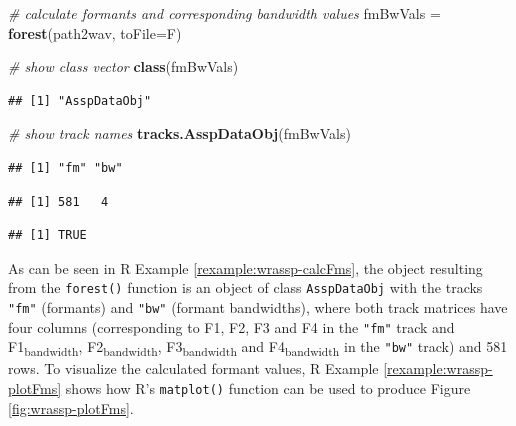 \documentclass[]{book}
\newenvironment{Shaded}{\begin{snugshade}}{\end{snugshade}}
\newcommand{\CommentTok}[1]{\textcolor[rgb]{0.56,0.35,0.01}{\textit{#1}}}
\newcommand{\DataTypeTok}[1]{\textcolor[rgb]{0.13,0.29,0.53}{#1}}
\newcommand{\KeywordTok}[1]{\textcolor[rgb]{0.13,0.29,0.53}{\textbf{#1}}}
\newcommand{\NormalTok}[1]{#1}
\newcommand{\OperatorTok}[1]{\textcolor[rgb]{0.81,0.36,0.00}{\textbf{#1}}}
\newcommand{\StringTok}[1]{\textcolor[rgb]{0.31,0.60,0.02}{#1}}
\theoremstyle{definition}
\theoremstyle{definition}
\theoremstyle{definition}
\theoremstyle{remark}
\begin{document}
\begin{Shaded}
\begin{Highlighting}[]
\CommentTok{# calculate formants and corresponding bandwidth values}
\NormalTok{fmBwVals =}\StringTok{ }\KeywordTok{forest}\NormalTok{(path2wav, }\DataTypeTok{toFile=}\NormalTok{F)}

\CommentTok{# show class vector}
\KeywordTok{class}\NormalTok{(fmBwVals)}
\end{Highlighting}
\end{Shaded}

\begin{verbatim}
## [1] "AsspDataObj"
\end{verbatim}

\begin{Shaded}
\begin{Highlighting}[]
\CommentTok{# show track names}
\KeywordTok{tracks.AsspDataObj}\NormalTok{(fmBwVals)}
\end{Highlighting}
\end{Shaded}

\begin{verbatim}
## [1] "fm" "bw"
\end{verbatim}

\begin{Shaded}
\end{Shaded}

\begin{verbatim}
## [1] 581   4
\end{verbatim}

\begin{Shaded}
\end{Shaded}

\begin{verbatim}
## [1] TRUE
\end{verbatim}

As can be seen in R Example \ref{rexample:wrassp-calcFms}, the object
resulting from the \texttt{forest()} function is an object of class
\texttt{AsspDataObj} with the tracks \texttt{"fm"} (formants) and
\texttt{"bw"} (formant bandwidths), where both track matrices have four
columns (corresponding to F1, F2, F3 and F4 in the \texttt{"fm"} track
and F1\textsubscript{bandwidth}, F2\textsubscript{bandwidth},
F3\textsubscript{bandwidth} and F4\textsubscript{bandwidth} in the
\texttt{"bw"} track) and 581 rows. To visualize the calculated formant
values, R Example \ref{rexample:wrassp-plotFms} shows how R's
\texttt{matplot()} function can be used to produce Figure
\ref{fig:wrassp-plotFms}.
\end{document}
